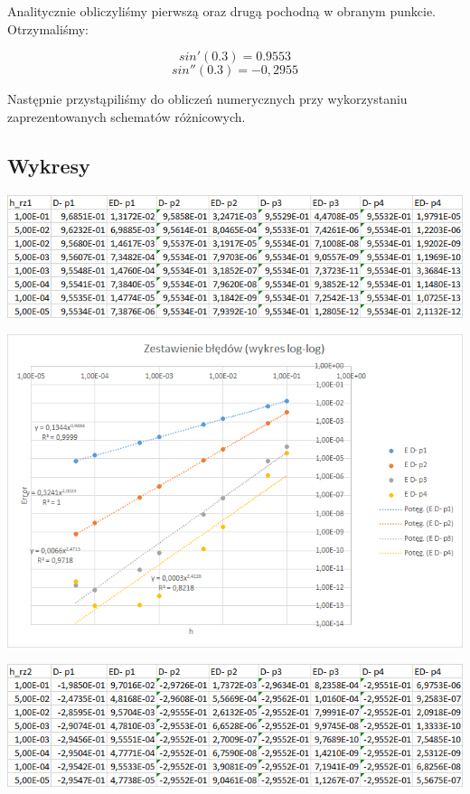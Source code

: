 Analitycznie obliczyliśmy pierwszą oraz drugą pochodną w obranym punkcie. Otrzymaliśmy:

$$sin'(0.3)=0.9553$$
$$sin''(0.3)=-0,2955$$

Następnie przystąpiliśmy do obliczeń numerycznych przy wykorzystaniu zaprezentowanych schematów różnicowych.
\newpage
\subsection{Wykresy}
\vspace{0.3cm}
\includegraphics{Lab2/charts/rz1_log_Db_dane.png}

\includegraphics{Lab2/charts/rz1_log_Db.png} 
\newpage


\includegraphics{Lab2/charts/rz2_log_Db_dane.png}

